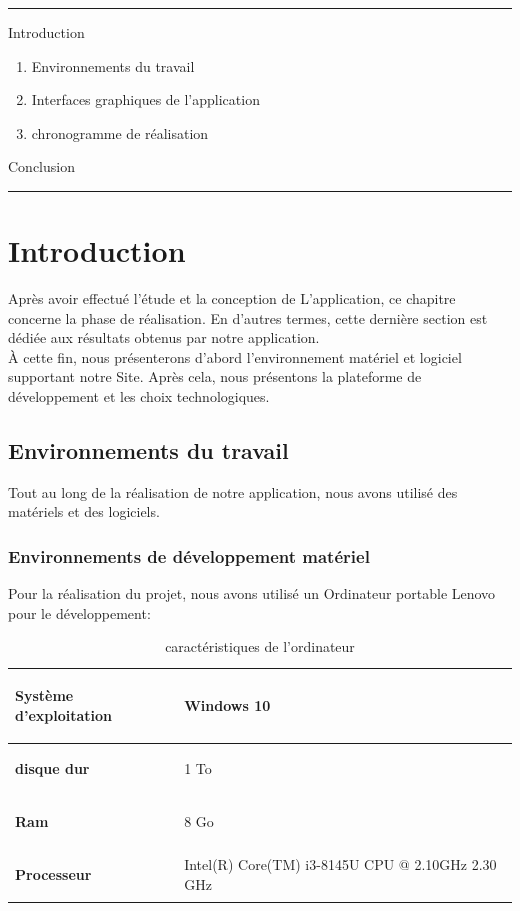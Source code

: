 \documentclass[12pt]{report}
\begin{document}
\hrule
\vspace{20pt}
Introduction
\begin{enumerate}
	\item Environnements du travail
	\item Interfaces graphiques de l'application
	\item chronogramme de réalisation
\end{enumerate}

Conclusion
\vspace{20pt}
\hrule

\newpage
\section*{Introduction}
Après avoir effectué l'étude et la conception de L'application, ce chapitre concerne la phase de réalisation. En d'autres termes, cette dernière section est dédiée aux résultats obtenus par notre application.\\ À cette fin, nous présenterons d'abord l'environnement matériel et logiciel supportant notre Site. Après cela, nous présentons la plateforme de développement et les choix technologiques.
\subsection{Environnements du travail}
Tout au long de la réalisation de notre application, nous avons utilisé des matériels et des logiciels.
\subsubsection{Environnements de développement matériel}
Pour la réalisation du projet, nous avons utilisé un Ordinateur portable Lenovo pour le développement:
\vspace{0.2cm}
\begin{table}[H]
\centering
\def\arraystretch{2.5}
\begin{tabular}{||p{5cm}||p{10cm}||}
   \hline
   \hline
   \begin{large}
    \textbf{Système d'exploitation}
   \end{large} & Windows 10\\
   \hline
   \hline
   \begin{large}
    \textbf{disque dur}
   \end{large} & 1 To \\
   \hline
   \hline
   \begin{large}
    \textbf{Ram}
   \end{large} & 8 Go\\
   \hline
   \hline
   \begin{large}
    \textbf{Processeur}
   \end{large} & Intel(R) Core(TM) i3-8145U CPU @ 2.10GHz   2.30 GHz\\
   \hline
   \hline
\end{tabular}
\caption{caractéristiques de l'ordinateur}
\end{table}
\vspace{0.5cm}
\end{document}
